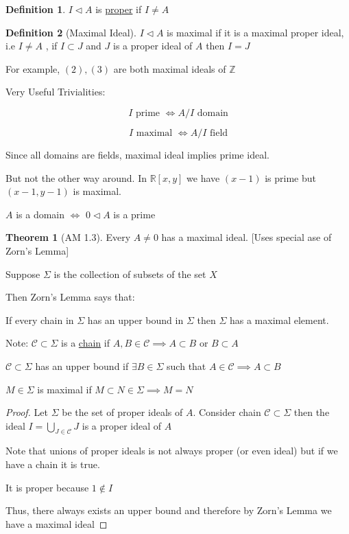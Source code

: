 \documentclass{article}
\theoremstyle{definition}
\newtheorem{definition}{Definition}
\newtheorem{theorem}{Theorem}
\begin{document}
\begin{definition}
    \(I\triangleleft A\) is \underline{proper} if \(I \neq A\)  
\end{definition}

\begin{definition}
    [Maximal Ideal]

    \(I \triangleleft A\) is maximal if it is a maximal proper ideal, i.e \(I \neq A\) , if \(I \subset J\) and \(J\) is a proper ideal of \(A\) then \(I=J\) 

    For example, \((2),(3)\) are both maximal ideals of \(\mathbb{Z}\) 

\end{definition}

Very Useful Trivialities:

\[
    I \text{ prime } \iff A/I \text{ domain} 
\]

\[
    I \text{ maximal } \iff A/I \text{ field}  
\]

Since all domains are fields, maximal ideal implies prime ideal.

But not the other way around. In \(\mathbb{R} [x,y]\) we have \((x-1)\) is prime but \((x-1,y-1)\) is maximal.

\(A\) is a domain \(\iff \) \(0 \triangleleft A\) is a prime

\begin{theorem}
    [AM 1.3]

    Every \(A \neq 0\) has a maximal ideal. [Uses special ase of Zorn's Lemma]
\end{theorem}

Suppose \(\Sigma \) is the collection of subsets of the set \(X\) 

Then Zorn's Lemma says that:

If every chain in \(\Sigma \) has an upper bound in \(\Sigma\) then \(\Sigma\) has a maximal element.

Note: \(\mathcal{C} \subset \Sigma \) is a \underline{chain} if \(A,B\in \mathcal{C} \implies  A \subset B\) or \(B \subset A\) 

\(\mathcal{C} \subset \Sigma\) has an upper bound if \(\exists B\in \Sigma \) such that \(A\in \mathcal{C} \implies A \subset B\) 

\(M \in \Sigma \) is maximal if \(M\subset N\in \Sigma \implies M = N\) 

\begin{proof}
    Let \(\Sigma \) be the set of proper ideals of \(A\). Consider chain \(\mathcal{C} \subset \Sigma\) then the ideal \(I = \bigcup_{J\in \mathcal{C} }^{} J\) is a proper ideal of \(A\) 

    Note that unions of proper ideals is not always proper (or even ideal) but if we have a chain it is true.

    It is proper because \(1 \notin I\) 

    Thus, there always exists an upper bound and therefore by Zorn's Lemma we have a maximal ideal

\end{proof}
\end{document}
